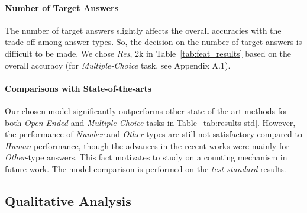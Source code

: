 \documentclass{article}
\begin{document}
\paragraph{Number of Target Answers} The number of target answers slightly affects the overall accuracies with the trade-off among answer types. So, the decision on the number of target answers is difficult to be made. We chose \textit{Res}, 2k in Table~\ref{tab:feat_results} based on the overall accuracy (for \textit{Multiple-Choice} task, see Appendix A.1).

\paragraph{Comparisons with State-of-the-arts} Our chosen model significantly outperforms other state-of-the-art methods for both \textit{Open-Ended} and \textit{Multiple-Choice} tasks in Table~\ref{tab:results-std}. However, the performance of \textit{Number} and \textit{Other} types are still not satisfactory compared to \textit{Human} performance, though the advances in the recent works were mainly for \textit{Other}-type answers. This fact motivates to study on a counting mechanism in future work. The model comparison is performed on the \textit{test-standard} results.

\subsection{Qualitative Analysis}
\label{subsec:visualization}
\end{document}
